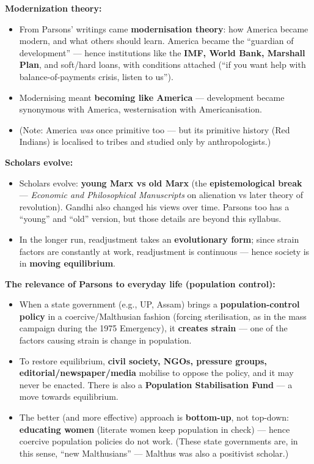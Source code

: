 \begin{KeyConcept}
\textbf{Modernization theory:}
\begin{itemize}
\item From Parsons' writings came \textbf{modernisation theory}: how America became modern, and what others should learn. America became the ``guardian of development'' --- hence institutions like the \textbf{IMF, World Bank, Marshall Plan}, and soft/hard loans, with conditions attached (``if you want help with balance-of-payments crisis, listen to us'').
\item Modernising meant \textbf{becoming like America} --- development became synonymous with America, westernisation with Americanisation.
\item (Note: America \textit{was} once primitive too --- but its primitive history (Red Indians) is localised to tribes and studied only by anthropologists.)
\end{itemize}
\end{KeyConcept}

\begin{CriticalPoint}
\textbf{Scholars evolve:}
\begin{itemize}
\item Scholars evolve: \textbf{young Marx vs old Marx} (the \textbf{epistemological break} --- \textit{Economic and Philosophical Manuscripts} on alienation vs later theory of revolution). Gandhi also changed his views over time. Parsons too has a ``young'' and ``old'' version, but those details are beyond this syllabus.
\item In the longer run, readjustment takes an \textbf{evolutionary form}; since strain factors are constantly at work, readjustment is continuous --- hence society is in \textbf{moving equilibrium}.
\end{itemize}
\end{CriticalPoint}

\begin{ExampleBox}
\textbf{The relevance of Parsons to everyday life (population control):}
\begin{itemize}
\item When a state government (e.g., UP, Assam) brings a \textbf{population-control policy} in a coercive/Malthusian fashion (forcing sterilisation, as in the mass campaign during the 1975 Emergency), it \textbf{creates strain} --- one of the factors causing strain is change in population.
\item To restore equilibrium, \textbf{civil society, NGOs, pressure groups, editorial/newspaper/media} mobilise to oppose the policy, and it may never be enacted. There is also a \textbf{Population Stabilisation Fund} --- a move towards equilibrium.
\item The better (and more effective) approach is \textbf{bottom-up}, not top-down: \textbf{educating women} (literate women keep population in check) --- hence coercive population policies do not work. (These state governments are, in this sense, ``new Malthusians'' --- Malthus was also a positivist scholar.)
\end{itemize}
\end{ExampleBox}

